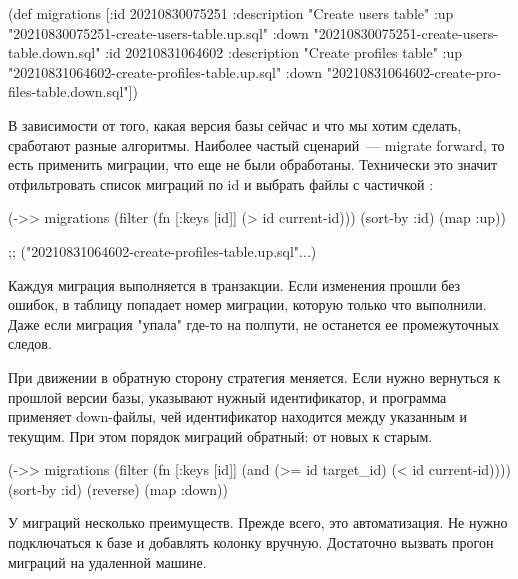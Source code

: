 \begin{english}
  \begin{clojure}
(def migrations
  [{:id 20210830075251
    :description "Create users table"
    :up "20210830075251-create-users-table.up.sql"
    :down "20210830075251-create-users-table.down.sql"}
   {:id 20210831064602
    :description "Create profiles table"
    :up "20210831064602-create-profiles-table.up.sql"
    :down "20210831064602-create-profiles-table.down.sql"}])
  \end{clojure}
\end{english}

В зависимости от того, какая версия базы сейчас и что мы хотим сделать, сработают разные алгоритмы. Наиболее частый сценарий~--- migrate forward, то есть применить миграции, что еще не были обработаны. Технически это значит отфильтровать список миграций по id и выбрать файлы с частичкой :

\begin{english}
  \begin{clojure}
(->> migrations
     (filter (fn [{:keys [id]}]
               (> id current-id)))
     (sort-by :id)
     (map :up))

;; ("20210831064602-create-profiles-table.up.sql"...)
  \end{clojure}
\end{english}

Каждуя миграция выполняется в транзакции. Если изменения прошли без ошибок, в таблицу  попадает номер миграции, которую только что выполнили. Даже если миграция "упала" где-то на полпути, не останется ее промежуточных следов.

При движении в обратную сторону стратегия меняется. Если нужно вернуться к прошлой версии базы, указывают нужный идентификатор, и программа применяет down-файлы, чей идентификатор находится между указанным и текущим. При этом порядок миграций обратный: от новых к старым.

\begin{english}
  \begin{clojure}
(->> migrations
     (filter (fn [{:keys [id]}]
               (and (>= id target_id)
                    (< id current-id))))
     (sort-by :id)
     (reverse)
     (map :down))
  \end{clojure}
\end{english}

У миграций несколько преимуществ. Прежде всего, это автоматизация. Не нужно подключаться к базе и добавлять колонку вручную. Достаточно вызвать прогон миграций на удаленной машине.

